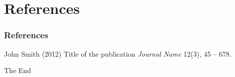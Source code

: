 \documentclass{beamer}
\begin{document}
\section{References}
\begin{frame}
\frametitle{References}
\footnotesize{
\begin{thebibliography}{99} %
 John Smith (2012)
\newblock Title of the publication
\newblock \emph{Journal Name} 12(3), 45 -- 678.
\end{thebibliography}
}
\end{frame}


\begin{frame}
\Huge{\centerline{The End}}
\end{frame}
\end{document}
